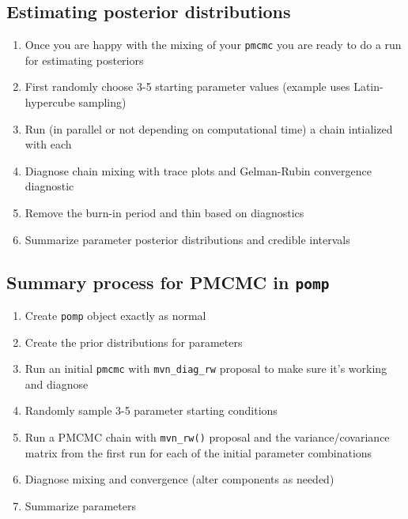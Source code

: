 \documentclass[
  letterpaper,
  DIV=11,
  numbers=noendperiod]{scrartcl}
\providecommand{\tightlist}{%
  \setlength{\itemsep}{0pt}\setlength{\parskip}{0pt}}\usepackage{longtable,booktabs,array}
\begin{document}
\hypertarget{estimating-posterior-distributions}{%
\subsection{Estimating posterior
distributions}\label{estimating-posterior-distributions}}

\large

\begin{enumerate}
\def\labelenumi{\arabic{enumi}.}
\tightlist
\item
  Once you are happy with the mixing of your \texttt{pmcmc} you are
  ready to do a run for estimating posteriors
\item
  First randomly choose 3-5 starting parameter values (example uses
  Latin-hypercube sampling)
\item
  Run (in parallel or not depending on computational time) a chain
  intialized with each
\item
  Diagnose chain mixing with trace plots and Gelman-Rubin convergence
  diagnostic
\item
  Remove the burn-in period and thin based on diagnostics
\item
  Summarize parameter posterior distributions and credible intervals
\end{enumerate}

\hypertarget{summary-process-for-pmcmc-in-pomp}{%
\subsection{\texorpdfstring{Summary process for PMCMC in
\texttt{pomp}}{Summary process for PMCMC in pomp}}\label{summary-process-for-pmcmc-in-pomp}}

\large

\begin{enumerate}
\def\labelenumi{\arabic{enumi}.}
\tightlist
\item
  Create \texttt{pomp} object exactly as normal
\item
  Create the prior distributions for parameters
\item
  Run an initial \texttt{pmcmc} with \texttt{mvn\_diag\_rw} proposal to
  make sure it's working and diagnose
\item
  Randomly sample 3-5 parameter starting conditions
\item
  Run a PMCMC chain with \texttt{mvn\_rw()} proposal and the
  variance/covariance matrix from the first run for each of the initial
  parameter combinations
\item
  Diagnose mixing and convergence (alter components as needed)
\item
  Summarize parameters
\end{enumerate}
\end{document}
